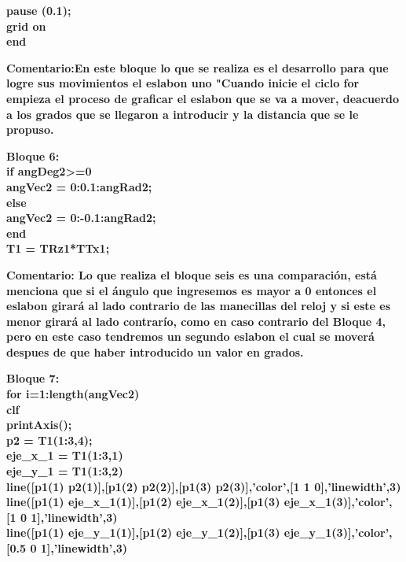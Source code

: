 \documentclass[10pt,a4paper]{article}
\begin{document}
\begin{flushleft}
\textbf{pause (0.1);\\ grid on\\
end}
\end{flushleft}

\begin{flushleft}
\textbf{Comentario:En este bloque lo que se realiza es el desarrollo para que logre sus movimientos el eslabon uno "Cuando inicie el ciclo for empieza el proceso de graficar el eslabon que se va a mover, deacuerdo a los grados que se llegaron a introducir y la distancia que se le propuso.\\}
\end{flushleft}

\begin{flushleft}
\textbf{Bloque 6:\\
if angDeg2>=0\\
    angVec2 = 0:0.1:angRad2;\\
else\\
    angVec2 = 0:-0.1:angRad2;\\
end\\
T1 = TRz1*TTx1;}
\end{flushleft}

\begin{flushleft}
\textbf{Comentario: Lo que realiza el bloque seis es una comparación, está menciona que si el ángulo que ingresemos es mayor a 0 entonces el eslabon girará al lado contrario de las manecillas del reloj y si este es menor girará al lado contrarío, como en caso contrario del Bloque 4, pero en este caso tendremos un segundo eslabon el cual se moverá despues de que haber introducido un valor en grados.}
\end{flushleft}

\begin{flushleft}
\textbf{Bloque 7:\\
for i=1:length(angVec2)\\
clf\\
printAxis();\\
p2 = T1(1:3,4);\\
eje\_x\_1 = T1(1:3,1)\\
eje\_y\_1 = T1(1:3,2)\\
line([p1(1) p2(1)],[p1(2) p2(2)],[p1(3) p2(3)],'color',[1 1 0],'linewidth',3)\\
line([p1(1) eje\_x\_1(1)],[p1(2) eje\_x\_1(2)],[p1(3) eje\_x\_1(3)],'color',[1 0 1],'linewidth',3)\\
line([p1(1) eje\_y\_1(1)],[p1(2) eje\_y\_1(2)],[p1(3) eje\_y\_1(3)],'color',[0.5 0 1],'linewidth',3)\\
}
\end{flushleft}
\end{document}
